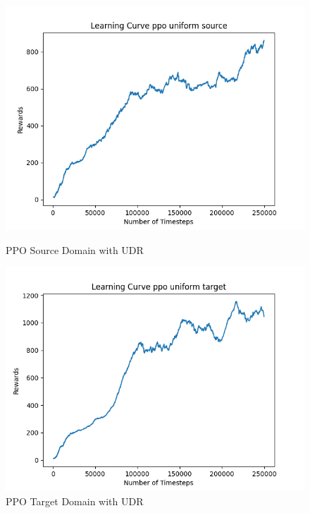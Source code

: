 \documentclass[11pt]{article}
\begin{document}
\begin{figure}[H]
    \vfill
    \begin{minipage}{0.45\textwidth}
        \centering
        \includegraphics[width=\textwidth]{../images/Learning_Curve_PPO_Uniform_Source.png}
        \caption{PPO Source Domain with UDR}
        \label{fig:ppo_source_udr}
    \end{minipage}
    \hfill
    \begin{minipage}{0.45\textwidth}
        \centering
        \includegraphics[width=\textwidth]{../images/Learning_Curve_PPO_Uniform_Target.png}
        \caption{PPO Target Domain with UDR}
        \label{fig:ppo_target_udr}
    \end{minipage}
\end{figure}
\end{document}
